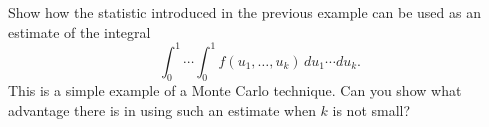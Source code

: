 Show how the statistic introduced in the previous example can be used as an estimate of the integral
$$\int_0^1 \cdots \int_0^1 f(u_1, \ldots, u_k) \, du_1 \cdots du_k.$$
This is a simple example of a Monte Carlo technique. Can you show what advantage there is in using such an estimate when $k$ is not small?
